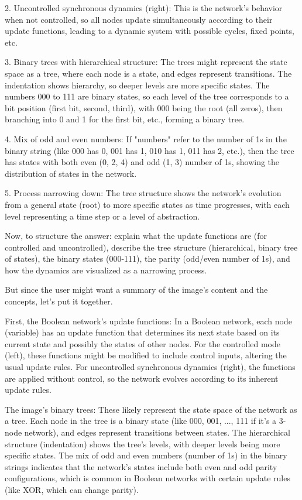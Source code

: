 2. Uncontrolled synchronous dynamics (right): This is the network's behavior when not controlled, so all nodes update simultaneously according to their update functions, leading to a dynamic system with possible cycles, fixed points, etc.

3. Binary trees with hierarchical structure: The trees might represent the state space as a tree, where each node is a state, and edges represent transitions. The indentation shows hierarchy, so deeper levels are more specific states. The numbers 000 to 111 are binary states, so each level of the tree corresponds to a bit position (first bit, second, third), with 000 being the root (all zeros), then branching into 0 and 1 for the first bit, etc., forming a binary tree.

4. Mix of odd and even numbers: If "numbers" refer to the number of 1s in the binary string (like 000 has 0, 001 has 1, 010 has 1, 011 has 2, etc.), then the tree has states with both even (0, 2, 4) and odd (1, 3) number of 1s, showing the distribution of states in the network.

5. Process narrowing down: The tree structure shows the network's evolution from a general state (root) to more specific states as time progresses, with each level representing a time step or a level of abstraction.

Now, to structure the answer: explain what the update functions are (for controlled and uncontrolled), describe the tree structure (hierarchical, binary tree of states), the binary states (000-111), the parity (odd/even number of 1s), and how the dynamics are visualized as a narrowing process.

But since the user might want a summary of the image's content and the concepts, let's put it together.

First, the Boolean network's update functions: In a Boolean network, each node (variable) has an update function that determines its next state based on its current state and possibly the states of other nodes. For the controlled mode (left), these functions might be modified to include control inputs, altering the usual update rules. For uncontrolled synchronous dynamics (right), the functions are applied without control, so the network evolves according to its inherent update rules.

The image's binary trees: These likely represent the state space of the network as a tree. Each node in the tree is a binary state (like 000, 001, ..., 111 if it's a 3-node network), and edges represent transitions between states. The hierarchical structure (indentation) shows the tree's levels, with deeper levels being more specific states. The mix of odd and even numbers (number of 1s) in the binary strings indicates that the network's states include both even and odd parity configurations, which is common in Boolean networks with certain update rules (like XOR, which can change parity).

